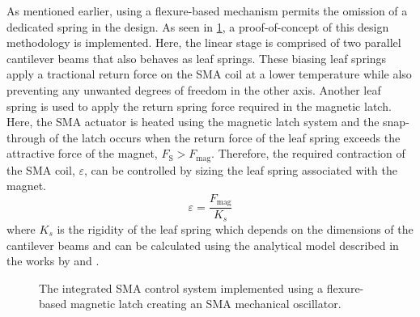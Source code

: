 As mentioned earlier, using a flexure-based mechanism permits the omission of a dedicated spring in the design. As seen in \cref{fig:proto-full}, a proof-of-concept of this design methodology is implemented. Here, the linear stage is comprised of two parallel cantilever beams that also behaves as leaf springs. These biasing leaf springs apply a tractional return force on the SMA coil at a lower temperature while also preventing any unwanted degrees of freedom in the other axis. Another leaf spring is used to apply the return spring force required in the magnetic latch. Here, the SMA actuator is heated using the magnetic latch system and the snap-through of the latch occurs when the return force of the leaf spring exceeds the attractive force of the magnet, $F_\textrm{S}>F_\textrm{mag}$. Therefore, the required contraction of the SMA coil, $\varepsilon$, can be controlled by sizing the leaf spring associated with the magnet.
\begin{equation}\label{eq:osc-stroke-sizing}
    \varepsilon = \frac{F_\textrm{mag}}{K_s}
\end{equation}
where $K_s$ is the rigidity of the leaf spring which depends on the dimensions of the cantilever beams and can be calculated using the analytical model described in the works by \cite{rubbertIsotropicSpringsBased2016} and \cite{heneinParallelSpringStages1998}.

\begin{figure}[htb!] %
  \centering
  \caption{The integrated SMA control system implemented using a flexure-based magnetic latch creating an SMA mechanical oscillator.}
  \label{fig:proto-full}
\end{figure}

